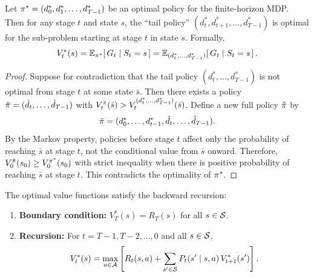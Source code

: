 \documentclass[11pt,a4paper]{article}
\begin{document}
\begin{theorem}
\label{thm:principle-optimality}
Let $\pi^* = (d_0^*, d_1^*, \ldots, d_{T-1}^*)$ be an optimal
policy for the finite-horizon MDP. Then for any stage $t$ and state
$s$, the ``tail policy'' $(d_t^*, d_{t+1}^*, \ldots, d_{T-1}^*)$ is
optimal for the sub-problem starting at stage $t$ in state $s$.
Formally,
\[
    V_t^*(s)
    = \mathbb{E}_{\pi^*}\!\left[\, G_t \mid S_t = s \,\right]
    = \mathbb{E}_{(d_t^*, \ldots, d_{T-1}^*)}\!\left[\, G_t \mid S_t = s
    \,\right].
\]
\end{theorem}

\begin{proof}
Suppose for contradiction that the tail policy
$(d_t^*, \ldots, d_{T-1}^*)$ is not optimal from stage $t$ at some
state $\bar{s}$. Then there exists a policy
$\hat{\pi} = (\hat{d}_t, \ldots, \hat{d}_{T-1})$ with
$V_t^{\hat{\pi}}(\bar{s}) > V_t^{(d_t^*, \ldots,
d_{T-1}^*)}(\bar{s})$. Define a new full policy $\tilde{\pi}$ by
\[
    \tilde{\pi} = (d_0^*, \ldots, d_{t-1}^*, \hat{d}_t, \ldots,
    \hat{d}_{T-1}).
\]
By the Markov property, policies before stage $t$ affect only the
probability of reaching $\bar{s}$ at stage $t$, not the conditional
value from $\bar{s}$ onward. Therefore,
$V_0^{\tilde{\pi}}(s_0) \geq V_0^{\pi^*}(s_0)$ with strict
inequality when there is positive probability of reaching $\bar{s}$
at stage $t$. This contradicts the optimality of $\pi^*$.
\end{proof}

\begin{theorem}
\label{thm:fh-bellman}
The optimal value functions satisfy the backward recursion:
\begin{enumerate}[nosep]
    \item \textbf{Boundary condition:} $V_T^*(s) = R_T(s)$ for all
    $s \in \mathcal{S}$.
    \item \textbf{Recursion:} For $t = T-1, T-2, \ldots, 0$ and all
    $s \in \mathcal{S}$,
    \begin{equation}
    \label{eq:fh-bellman}
        V_t^*(s) = \max_{a \in \mathcal{A}} \left[ R_t(s,a)
        + \sum_{s' \in \mathcal{S}} P_t(s' \mid s,a)\, V_{t+1}^*(s')
        \right].
    \end{equation}
\end{enumerate}
\end{theorem}
\end{document}
